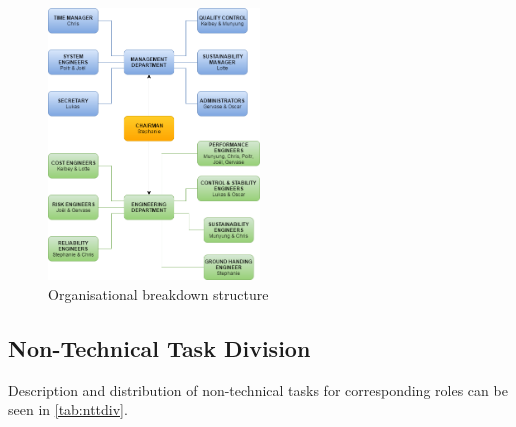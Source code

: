 \begin{figure}[H]
    \centering
    \includegraphics[width=0.5\textwidth]{ProjectOrganisation/Figures/Organogram}
    \caption{Organisational breakdown structure}
    \label{fig:organogram}
\end{figure}

\subsection{Non-Technical Task Division}
Description and distribution of non-technical tasks for corresponding roles can be seen in \autoref{tab:nttdiv}.

